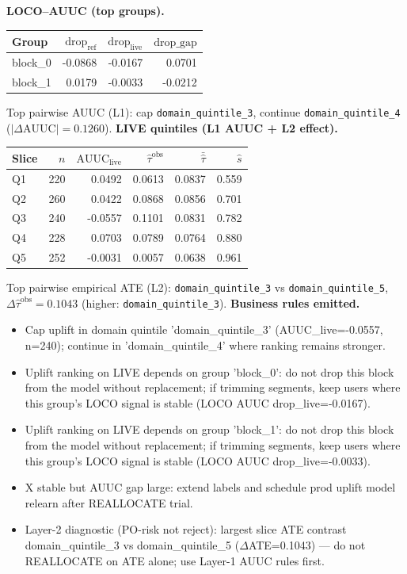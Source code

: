 \documentclass{article}
\begin{document}
\noindent\textbf{LOCO--AUUC (top groups).}
\begin{center}\small
\begin{tabular}{lrrr}
\toprule Group & $\mathrm{drop}_{\mathrm{ref}}$ & $\mathrm{drop}_{\mathrm{live}}$ & $\mathrm{drop\_gap}$ \\
\midrule
block\_0 & -0.0868 & -0.0167 & 0.0701 \\
block\_1 & 0.0179 & -0.0033 & -0.0212 \\
\bottomrule\end{tabular}\end{center}
\noindent Top pairwise AUUC (L1): cap \texttt{domain\_quintile\_3}, continue \texttt{domain\_quintile\_4} ($|\Delta\mathrm{AUUC}|=0.1260$).
\noindent\textbf{LIVE quintiles (L1 AUUC + L2 effect).}
\begin{center}\small
\begin{tabular}{lrrrrr}
\toprule Slice & $n$ & $\mathrm{AUUC}_{\mathrm{live}}$ & $\widehat{\tau}^{\mathrm{obs}}$ & $\bar{\hat\tau}$ & $\hat s$ \\
\midrule
Q1 & 220 & 0.0492 & 0.0613 & 0.0837 & 0.559 \\
Q2 & 260 & 0.0422 & 0.0868 & 0.0856 & 0.701 \\
Q3 & 240 & -0.0557 & 0.1101 & 0.0831 & 0.782 \\
Q4 & 228 & 0.0703 & 0.0789 & 0.0764 & 0.880 \\
Q5 & 252 & -0.0031 & 0.0057 & 0.0638 & 0.961 \\
\bottomrule\end{tabular}\end{center}
\noindent Top pairwise empirical ATE (L2): \texttt{domain\_quintile\_3} vs \texttt{domain\_quintile\_5}, $\Delta\widehat{\tau}^{\mathrm{obs}}=0.1043$ (higher: \texttt{domain\_quintile\_3}).
\noindent\textbf{Business rules emitted.}
\begin{itemize}\itemsep2pt
\item[\textsc{REALLOCATE} (P1).] Cap uplift in domain quintile 'domain\_quintile\_3' (AUUC\_live=-0.0557, n=240); continue in 'domain\_quintile\_4' where ranking remains stronger.
\item[\textsc{REALLOCATE} (P2).] Uplift ranking on LIVE depends on group 'block\_0': do not drop this block from the model without replacement; if trimming segments, keep users where this group's LOCO signal is stable (LOCO AUUC drop\_live=-0.0167).
\item[\textsc{REALLOCATE} (P2).] Uplift ranking on LIVE depends on group 'block\_1': do not drop this block from the model without replacement; if trimming segments, keep users where this group's LOCO signal is stable (LOCO AUUC drop\_live=-0.0033).
\item[\textsc{RELEARN} (P2).] X stable but AUUC gap large: extend labels and schedule prod uplift model relearn after REALLOCATE trial.
\item[\textsc{MONITOR} (P4).] Layer-2 diagnostic (PO-risk not reject): largest slice ATE contrast domain\_quintile\_3 vs domain\_quintile\_5 ($\Delta$ATE=0.1043) --- do not REALLOCATE on ATE alone; use Layer-1 AUUC rules first.
\end{itemize}
\end{document}
